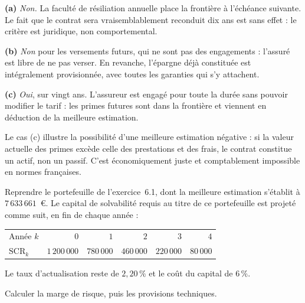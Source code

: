 \begin{corrige}
\textbf{(a)} \emph{Non.} La faculté de résiliation annuelle place la frontière à
l'échéance suivante. Le fait que le contrat sera vraisemblablement reconduit dix
ans est sans effet : le critère est juridique, non comportemental.

\medskip
\textbf{(b)} \emph{Non} pour les versements futurs, qui ne sont pas des
engagements : l'assuré est libre de ne pas verser. En revanche, l'épargne déjà
constituée est intégralement provisionnée, avec toutes les garanties qui s'y
attachent.

\medskip
\textbf{(c)} \emph{Oui}, sur vingt ans. L'assureur est engagé pour toute la
durée sans pouvoir modifier le tarif : les primes futures sont dans la frontière
et viennent en déduction de la meilleure estimation.

\medskip
Le cas (c) illustre la possibilité d'une meilleure estimation négative : si la
valeur actuelle des primes excède celle des prestations et des frais, le contrat
constitue un actif, non un passif. C'est économiquement juste et comptablement
impossible en normes françaises.
\end{corrige}

\begin{exercice}
Reprendre le portefeuille de l'exercice~6.1, dont la meilleure estimation
s'établit à $7\,633\,661$~\euro. Le capital de solvabilité requis au titre de ce
portefeuille est projeté comme suit, en fin de chaque année :
\begin{center}\small
\begin{tabular}{lrrrrr}
\toprule
Année $k$ & $0$ & $1$ & $2$ & $3$ & $4$ \\
$\mathrm{SCR}_k$ & $1\,200\,000$ & $780\,000$ & $460\,000$ & $220\,000$ & $80\,000$ \\
\bottomrule
\end{tabular}
\end{center}
Le taux d'actualisation reste de $2{,}20\,\%$ et le coût du capital de $6\,\%$.

Calculer la marge de risque, puis les provisions techniques.
\end{exercice}

